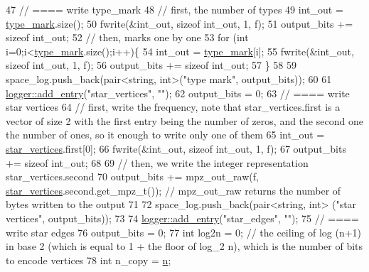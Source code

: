 \begin{DoxyCode}
47   \textcolor{comment}{// ==== write type\_mark}
48   \textcolor{comment}{// first, the number of types}
49   int\_out = \hyperlink{classmarked__graph__compressed_a86b00223525703e973415cbc9c94da68}{type\_mark}.size();
50   fwrite(&int\_out, \textcolor{keyword}{sizeof} int\_out, 1, f);
51   output\_bits += \textcolor{keyword}{sizeof} int\_out;
52   \textcolor{comment}{// then, marks one by one}
53   \textcolor{keywordflow}{for} (\textcolor{keywordtype}{int} i=0;i<\hyperlink{classmarked__graph__compressed_a86b00223525703e973415cbc9c94da68}{type\_mark}.size();i++)\{
54     int\_out = \hyperlink{classmarked__graph__compressed_a86b00223525703e973415cbc9c94da68}{type\_mark}[i];
55     fwrite(&int\_out, \textcolor{keyword}{sizeof} int\_out, 1, f);
56     output\_bits += \textcolor{keyword}{sizeof} int\_out;
57   \}
58 
59   space\_log.push\_back(pair<string, int>(\textcolor{stringliteral}{"type mark"}, output\_bits));
60 
61   \hyperlink{classlogger_a710163deb17bc81f70d53d285b8ac9ac}{logger::add\_entry}(\textcolor{stringliteral}{"star\_vertices"}, \textcolor{stringliteral}{""});
62   output\_bits = 0;
63   \textcolor{comment}{// ==== write star vertices}
64   \textcolor{comment}{// first, write the frequency, note that star\_vertices.first is a vector of size 2 with the first entry
       being the number of zeros, and the second one the number of ones, so it enough to write only one of them}
65   int\_out = \hyperlink{classmarked__graph__compressed_a7a4ced4586e2e353f9076bd447df5208}{star\_vertices}.first[0];
66   fwrite(&int\_out, \textcolor{keyword}{sizeof} int\_out, 1, f);
67   output\_bits += \textcolor{keyword}{sizeof} int\_out;
68 
69   \textcolor{comment}{// then, we write the integer representation star\_vertices.second}
70   output\_bits +=  mpz\_out\_raw(f, \hyperlink{classmarked__graph__compressed_a7a4ced4586e2e353f9076bd447df5208}{star\_vertices}.second.get\_mpz\_t()); \textcolor{comment}{// mpz\_out\_raw returns the
       number of bytes written to the output}
71 
72   space\_log.push\_back(pair<string, int> (\textcolor{stringliteral}{"star vertices"}, output\_bits));
73 
74   \hyperlink{classlogger_a710163deb17bc81f70d53d285b8ac9ac}{logger::add\_entry}(\textcolor{stringliteral}{"star\_edges"}, \textcolor{stringliteral}{""});
75   \textcolor{comment}{// ==== write star edges}
76   output\_bits = 0;
77   \textcolor{keywordtype}{int} log2n = 0; \textcolor{comment}{// the ceiling of log (n+1) in base 2 (which is equal to 1 + the floor of log\_2 n), which
       is the number of bits to encode vertices}
78   \textcolor{keywordtype}{int} n\_copy = \hyperlink{classmarked__graph__compressed_a8d841016ddb11cfd33748c8deb6277ba}{n};

\end{DoxyCode}
